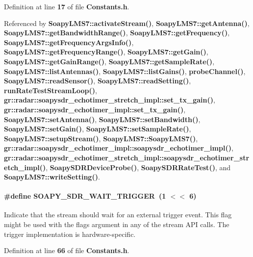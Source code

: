 Definition at line {\bf 17} of file {\bf Constants.\+h}.



Referenced by {\bf Soapy\+L\+M\+S7\+::activate\+Stream()}, {\bf Soapy\+L\+M\+S7\+::get\+Antenna()}, {\bf Soapy\+L\+M\+S7\+::get\+Bandwidth\+Range()}, {\bf Soapy\+L\+M\+S7\+::get\+Frequency()}, {\bf Soapy\+L\+M\+S7\+::get\+Frequency\+Args\+Info()}, {\bf Soapy\+L\+M\+S7\+::get\+Frequency\+Range()}, {\bf Soapy\+L\+M\+S7\+::get\+Gain()}, {\bf Soapy\+L\+M\+S7\+::get\+Gain\+Range()}, {\bf Soapy\+L\+M\+S7\+::get\+Sample\+Rate()}, {\bf Soapy\+L\+M\+S7\+::list\+Antennas()}, {\bf Soapy\+L\+M\+S7\+::list\+Gains()}, {\bf probe\+Channel()}, {\bf Soapy\+L\+M\+S7\+::read\+Sensor()}, {\bf Soapy\+L\+M\+S7\+::read\+Setting()}, {\bf run\+Rate\+Test\+Stream\+Loop()}, {\bf gr\+::radar\+::soapysdr\+\_\+echotimer\+\_\+stretch\+\_\+impl\+::set\+\_\+tx\+\_\+gain()}, {\bf gr\+::radar\+::soapysdr\+\_\+echotimer\+\_\+impl\+::set\+\_\+tx\+\_\+gain()}, {\bf Soapy\+L\+M\+S7\+::set\+Antenna()}, {\bf Soapy\+L\+M\+S7\+::set\+Bandwidth()}, {\bf Soapy\+L\+M\+S7\+::set\+Gain()}, {\bf Soapy\+L\+M\+S7\+::set\+Sample\+Rate()}, {\bf Soapy\+L\+M\+S7\+::setup\+Stream()}, {\bf Soapy\+L\+M\+S7\+::\+Soapy\+L\+M\+S7()}, {\bf gr\+::radar\+::soapysdr\+\_\+echotimer\+\_\+impl\+::soapysdr\+\_\+echotimer\+\_\+impl()}, {\bf gr\+::radar\+::soapysdr\+\_\+echotimer\+\_\+stretch\+\_\+impl\+::soapysdr\+\_\+echotimer\+\_\+stretch\+\_\+impl()}, {\bf Soapy\+S\+D\+R\+Device\+Probe()}, {\bf Soapy\+S\+D\+R\+Rate\+Test()}, and {\bf Soapy\+L\+M\+S7\+::write\+Setting()}.

\paragraph[{S\+O\+A\+P\+Y\+\_\+\+S\+D\+R\+\_\+\+W\+A\+I\+T\+\_\+\+T\+R\+I\+G\+G\+ER}]{\setlength{\rightskip}{0pt plus 5cm}\#define S\+O\+A\+P\+Y\+\_\+\+S\+D\+R\+\_\+\+W\+A\+I\+T\+\_\+\+T\+R\+I\+G\+G\+ER~(1 $<$$<$ 6)}\label{Constants_8h_af2c6959e3db9c9b968d467c39e5eb7b9}
Indicate that the stream should wait for an external trigger event. This flag might be used with the flags argument in any of the stream A\+PI calls. The trigger implementation is hardware-\/specific. 

Definition at line {\bf 66} of file {\bf Constants.\+h}.

